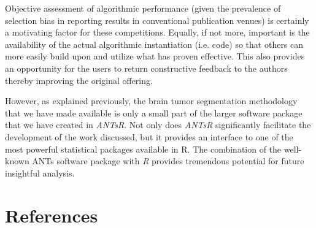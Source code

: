 \documentclass[preprint,authoryear,review,12pt]{elsarticle}
\begin{document}
Objective assessment  of algorithmic performance (given the prevalence of selection bias
in reporting results in conventional publication venues) is certainly a motivating
factor for these competitions. Equally, if not more, important
is the availability of the actual algorithmic instantiation (i.e. code) so that
others can more easily build upon and utilize what has proven effective. 
This also provides an opportunity for the users to return
constructive feedback to the authors thereby improving the original offering.  

However, as explained previously, the brain tumor segmentation 
methodology that we have made available is only a small part of the 
larger software package that we have created in \textit{ANTsR}.  Not only does
\textit{ANTsR} significantly facilitate the development of the work discussed,
but it provides an interface to one of the most powerful statistical
packages available in R.  The combination of the well-known ANTs software
package with \textit{R} provides tremendous potential for future insightful analysis.




\section*{References}



\end{document}
